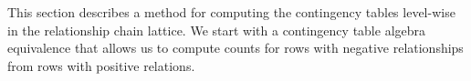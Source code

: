 \documentclass{vldb}
\begin{document}
This section describes a method for computing the contingency tables level-wise in the relationship chain lattice. We start with a contingency table algebra equivalence that allows us to compute counts for rows with negative relationships from rows with positive relations.
%
%
\end{document}
